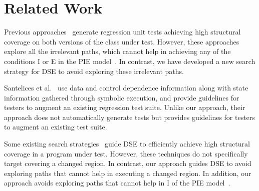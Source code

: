 
\section{Related Work}
\label{sec:related}
Previous approaches~\cite{evans:DiffTest07, taneja08:diffgen} generate regression unit tests achieving high structural coverage on both versions of the class under test. However, these approaches explore all the irrelevant paths, which cannot help in achieving any of the conditions I or E in the PIE model~\cite{voas}. In contrast, we have developed a new search strategy for DSE to avoid exploring these irrelevant paths. 


Santelices et al.~\cite{Apiwattanapong2006AUG, santelices08sep} use data and control dependence information along with state information gathered through symbolic execution, and provide guidelines for testers to augment an existing regression test suite. Unlike our approach, their approach does not automatically generate tests but provides guidelines for testers to augment an existing test suite. 

Some existing search strategies~\cite{burnim, fitnex} guide DSE to efficiently achieve high structural coverage in a program under test. However,
these techniques do not specifically target covering a changed region. In contrast, our approach guides DSE to avoid exploring paths that cannot help in executing a changed region. In addition, our approach avoids exploring paths that cannot help in I of the PIE model~\cite{voas}.

